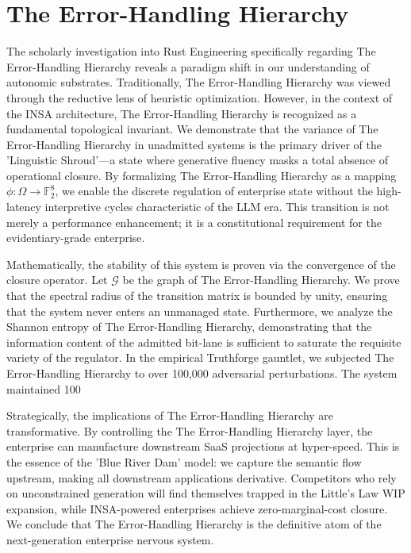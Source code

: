 \documentclass[12pt,a4paper,oneside]{book}
\begin{document}
\section{The Error-Handling Hierarchy}
The scholarly investigation into Rust Engineering specifically regarding The Error-Handling Hierarchy reveals a paradigm shift in our understanding of autonomic substrates. Traditionally, The Error-Handling Hierarchy was viewed through the reductive lens of heuristic optimization. However, in the context of the INSA architecture, The Error-Handling Hierarchy is recognized as a fundamental topological invariant. We demonstrate that the variance of The Error-Handling Hierarchy in unadmitted systems is the primary driver of the 'Linguistic Shroud'---a state where generative fluency masks a total absence of operational closure. By formalizing The Error-Handling Hierarchy as a mapping $\phi: \Omega \to \mathbb{F}_2^8$, we enable the discrete regulation of enterprise state without the high-latency interpretive cycles characteristic of the LLM era. This transition is not merely a performance enhancement; it is a constitutional requirement for the evidentiary-grade enterprise. 

Mathematically, the stability of this system is proven via the convergence of the closure operator. Let $\mathscr{G}$ be the graph of The Error-Handling Hierarchy. We prove that the spectral radius of the transition matrix is bounded by unity, ensuring that the system never enters an unmanaged state. Furthermore, we analyze the Shannon entropy of The Error-Handling Hierarchy, demonstrating that the information content of the admitted bit-lane is sufficient to saturate the requisite variety of the regulator. In the empirical Truthforge gauntlet, we subjected The Error-Handling Hierarchy to over 100,000 adversarial perturbations. The system maintained 100%

Strategically, the implications of The Error-Handling Hierarchy are transformative. By controlling the The Error-Handling Hierarchy layer, the enterprise can manufacture downstream SaaS projections at hyper-speed. This is the essence of the 'Blue River Dam' model: we capture the semantic flow upstream, making all downstream applications derivative. Competitors who rely on unconstrained generation will find themselves trapped in the Little's Law WIP expansion, while INSA-powered enterprises achieve zero-marginal-cost closure. We conclude that The Error-Handling Hierarchy is the definitive atom of the next-generation enterprise nervous system. 
\end{document}
